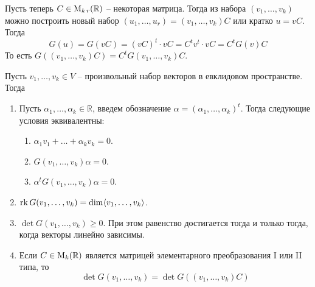 Пусть теперь $C\in \operatorname{M}_{k\,r}(\mathbb R)$ -- некоторая матрица.
Тогда из набора $(v_1,\ldots,v_k)$ можно построить новый набор $(u_1,\ldots,u_r) = (v_1,\ldots,v_k)C$ или кратко $u = vC$.
Тогда 
\[
G(u) = G(vC) = (vC)^t \cdot vC = C^t v^t \cdot v C = C^t G(v) C
\]
То есть $G((v_1,\ldots,v_k)C) = C^t G(v_1,\ldots,v_k)C$.

\begin{claim}
\label{claim::GramMatrixFull}
Пусть $v_1,\ldots,v_k\in V$ -- произвольный набор векторов в евклидовом пространстве.
Тогда
\begin{enumerate}
\item Пусть $\alpha_1,\ldots,\alpha_k \in \mathbb R$, введем обозначение $\alpha = (\alpha_1,\ldots,\alpha_k)^t$.
Тогда следующие условия эквивалентны:
\begin{enumerate}
\item $\alpha_1 v_1 + \ldots + \alpha_k v_k = 0$.

\item $G(v_1,\ldots,v_k)\alpha= 0$.

\item $\alpha^tG(v_1,\ldots,v_k)\alpha= 0$.
\end{enumerate}

\item $\operatorname{rk} G(v_1,\ldots,v_k) = \dim \langle v_1,\ldots,v_k\rangle$.

\item  $\det G(v_1,\ldots,v_k)\geqslant 0$.
При этом равенство достигается тогда и только тогда, когда векторы линейно зависимы.

\item Если $C\in\operatorname{M}_{k}(\mathbb R)$ является матрицей элементарного преобразования I или II типа, то 
\[
\det G(v_1,\ldots,v_k) = \det G((v_1,\ldots,v_k)C)
\]
\end{enumerate}
\end{claim}

